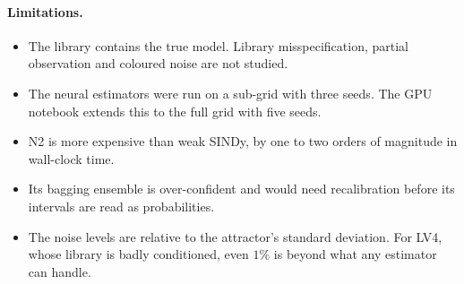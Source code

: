 \paragraph{Limitations.}
\begin{itemize}
  \item The library contains the true model. Library misspecification, partial observation and coloured noise are not studied.
  \item The neural estimators were run on a sub-grid with three seeds. The GPU notebook extends this to the full grid with five seeds.
  \item N2 is more expensive than weak SINDy, by one to two orders of magnitude in wall-clock time.
  \item Its bagging ensemble is over-confident and would need recalibration before its intervals are read as probabilities.
  \item The noise levels are relative to the attractor's standard deviation. For LV4, whose library is badly conditioned, even $1\%$ is beyond what any estimator can handle.
\end{itemize}


